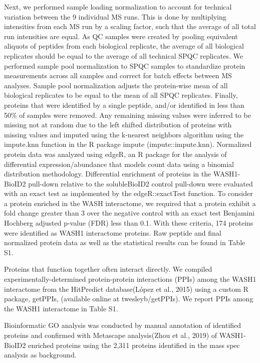 Next, we performed sample loading normalization to account for
technical variation between the 9 individual MS runs. This is done by
multiplying intensities from each MS run by a scaling factor, such that the
average of all total run intensities are equal. As QC samples were created by
pooling equivalent aliquots of peptides from each biological replicate, the
average of all biological replicates should be equal to the average of all
technical SPQC replicates. We performed sample pool normalization to SPQC
samples to standardize protein measurements across all samples and correct for
batch effects between MS analyses. Sample pool normalization adjusts the
protein-wise mean of all biological replicates to be equal to the mean of all
SPQC replicates. Finally, proteins that were identified by a single peptide,
and/or identified in less than 50\% of samples were removed. Any remaining
missing values were inferred to be missing not at random due to the left shifted
distribution of proteins with missing values and imputed using the k-nearest
neighbors algorithm using the impute.knn function in the R package impute
(impute::impute.knn). Normalized protein data was analyzed using edgeR, an R
package for the analysis of differential expression/abundance that models count
data using a binomial distribution methodology. Differential enrichment of
proteins in the WASH1-BioID2 pull-down relative to the solubleBioID2 control
pull-down were evaluated with an exact test as implemented by the
edgeR::exactTest function. To consider a protein enriched in the WASH
interactome, we required that a protein exhibit a fold change greater than 3
over the negative control with an exact test Benjamini Hochberg adjusted p-value
(FDR) less than 0.1. With these criteria, 174 proteins were identified as WASH1
interactome proteins. Raw peptide and final normalized protein data as well as
the statistical results can be found in Table S1.

Proteins that function together often interact directly. We compiled
experimentally-determined protein-protein interactions (PPIs) among the WASH1
interactome from the HitPredict database(López et al., 2015) using a custom R
package, getPPIs, (available online at twesleyb/getPPIs). We report PPIs among
the WASH1 interactome in Table S1.

Bioinformatic GO analysis was conducted by manual annotation of identified
proteins and confirmed with Metascape analysis(Zhou et al., 2019) of
WASH1-BioID2 enriched proteins using the 2,311 proteins identified in the mass
spec analysis as background.

